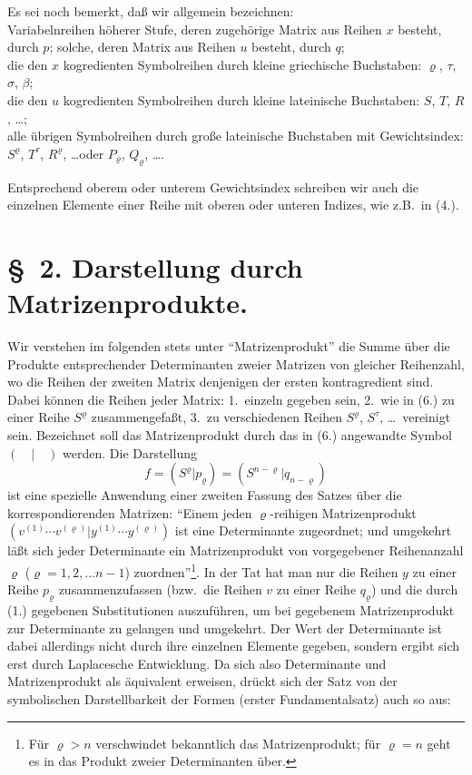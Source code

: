 \documentclass[12pt,a4paper]{article}
\begin{document}
Es sei noch bemerkt, daß wir allgemein bezeichnen:\\
Variabelnreihen höherer Stufe, deren zugehörige Matrix aus Reihen $x$ besteht, durch $p$; solche, deren Matrix aus Reihen $u$ besteht, durch $q$;\\
die den $x$ kogredienten Symbolreihen durch kleine griechische Buchstaben: $\varrho$, $\tau$, $\sigma$, $\beta$;\\
die den $u$ kogredienten Symbolreihen durch kleine lateinische Buchstaben: $S$, $T$, $R$, \ldots;\\
alle übrigen Symbolreihen durch große lateinische Buchstaben mit Gewichtsindex: $S^{\varrho}$, $T^{\tau}$, $R^{\varrho}$, \ldots oder $P_{\varrho}$, $Q_{\varrho}$, \ldots.

Entsprechend oberem oder unterem Gewichtsindex schreiben wir auch die einzelnen Elemente einer Reihe mit oberen oder unteren Indizes, wie z.B.\ in (4.).

\section*{\S\ 2. Darstellung durch Matrizenprodukte.}

Wir verstehen im folgenden stets unter ``Matrizenprodukt'' die Summe über die Produkte entsprechender Determinanten zweier Matrizen von gleicher Reihenzahl, wo die Reihen der zweiten Matrix denjenigen der ersten kontragredient sind. Dabei können die Reihen jeder Matrix: 1.\ einzeln gegeben sein, 2.\ wie in (6.) zu einer Reihe $S^{\varrho}$ zusammengefaßt, 3.\ zu verschiedenen Reihen $S^{\varrho}$, $S^{\tau}$, \ldots\ vereinigt sein. Bezeichnet soll das Matrizenprodukt durch das in (6.) angewandte Symbol $(\quad | \quad)$ werden. Die Darstellung
\begin{equation}\tag{6}
f = (S^{\varrho} | p_{\varrho}) = (S^{n-\varrho} | q_{n-\varrho})
\end{equation}
ist eine spezielle Anwendung einer zweiten Fassung des Satzes über die korrespondierenden Matrizen: ``Einem jeden $\varrho$-reihigen Matrizenprodukt $(v^{(1)} \cdots v^{(\varrho)} | y^{(1)} \cdots y^{(\varrho)})$ ist eine Determinante zugeordnet; und umgekehrt läßt sich jeder Determinante ein Matrizenprodukt von vorgegebener Reihenanzahl $\varrho$ ($\varrho = 1, 2, \ldots n-1$) zuordnen''\footnote{Für $\varrho > n$ verschwindet bekanntlich das Matrizenprodukt; für $\varrho = n$ geht es in das Produkt zweier Determinanten über.}. In der Tat hat man nur die Reihen $y$ zu einer Reihe $p_{\varrho}$ zusammenzufassen (bzw.\ die Reihen $v$ zu einer Reihe $q_{\varrho}$) und die durch (1.) gegebenen Substitutionen auszuführen, um bei gegebenem Matrizenprodukt zur Determinante zu gelangen und umgekehrt. Der Wert der Determinante ist dabei allerdings nicht durch ihre einzelnen Elemente gegeben, sondern ergibt sich erst durch Laplacesche Entwicklung. Da sich also Determinante und Matrizenprodukt als äquivalent erweisen, drückt sich der Satz von der symbolischen Darstellbarkeit der Formen (erster Fundamentalsatz) auch so aus:
\end{document}
